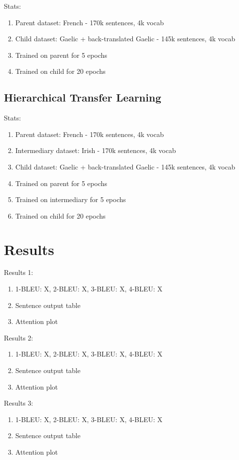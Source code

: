 Stats:
\begin{enumerate}
    \item Parent dataset: French - 170k sentences, 4k vocab
    \item Child dataset: Gaelic + back-translated Gaelic - 145k sentences, 4k vocab
    \item Trained on parent for 5 epochs
    \item Trained on child for 20 epochs
\end{enumerate}



\subsection{Hierarchical Transfer Learning}
\label{sec:4-hierarchical}
Stats:
\begin{enumerate}
    \item Parent dataset: French - 170k sentences, 4k vocab
    \item Intermediary dataset: Irish - 170k sentences, 4k vocab
    \item Child dataset: Gaelic + back-translated Gaelic - 145k sentences, 4k vocab
    \item Trained on parent for 5 epochs
    \item Trained on intermediary for 5 epochs
    \item Trained on child for 20 epochs
\end{enumerate}


\section{Results}

Results 1:
\begin{enumerate}
    \item 1-BLEU: X, 2-BLEU: X, 3-BLEU: X, 4-BLEU: X
    \item Sentence output table
    \item Attention plot
\end{enumerate}

Results 2:
\begin{enumerate}
    \item 1-BLEU: X, 2-BLEU: X, 3-BLEU: X, 4-BLEU: X
    \item Sentence output table
    \item Attention plot
\end{enumerate}

Results 3:
\begin{enumerate}
    \item 1-BLEU: X, 2-BLEU: X, 3-BLEU: X, 4-BLEU: X
    \item Sentence output table
    \item Attention plot
\end{enumerate}